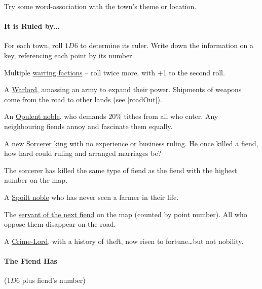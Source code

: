 \begin{multicols}{2}
Try some word-association with the town's theme or location.

\paragraph{It is Ruled by\ldots{}}

For each town, roll $1D6$ to determine its ruler.
Write down the information on a key, referencing each point by its number.

\begin{dlist}
  \item
  Multiple \underline{warring factions} -- roll twice more, with +1 to the second roll.
  \item
  A \underline{Warlord}, amassing an army to expand their power.
  Shipments of weapons come from the road to other lands
  (see \vref{roadOut}).
  \item
  An \underline{Opulent noble}, who demands 20\% tithes from all who enter.
  Any neighbouring fiends annoy and fascinate them equally.
  \item
  A new \underline{Sorcerer king} with no experience or business ruling.
  He once killed a fiend, how hard could ruling  and arranged marriages be?

  The sorcerer has killed the same type of fiend as the fiend with the highest number on the map.
  \item
  A \underline{Spoilt noble} who has never seen a farmer in their life.
  \item
  The \underline{servant of the next fiend} on the map (counted by point number).
  All who oppose them disappear on the road.
  \item
  A \underline{Crime-Lord}, with a history of theft, now risen to fortune\ldots but not nobility.

\end{dlist}

\paragraph{The Fiend Has}

($1D6$ plus fiend's number)


\end{multicols}
